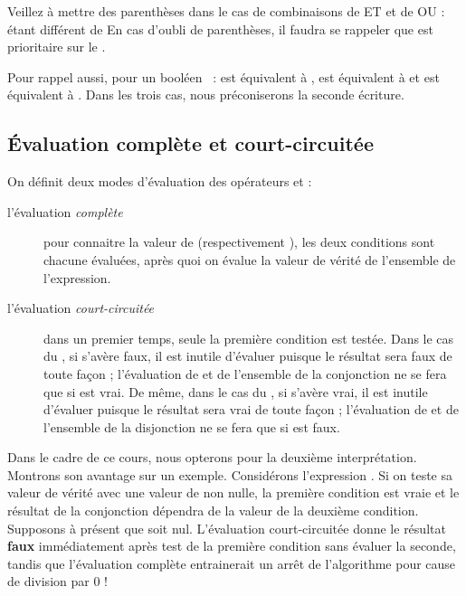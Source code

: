 			Veillez à mettre des parenthèses dans le cas de combinaisons de ET et de
			OU :  étant différent de
			 En cas
			d'oubli de parenthèses, il faudra se rappeler que
			 est prioritaire sur le .
			
			Pour rappel aussi, pour un booléen ~: 
			 est équivalent à ,
			 est équivalent à  et 
			 est équivalent à .
			Dans les trois cas, nous préconiserons la seconde écriture.
	
		\subsection{Évaluation complète et court-circuitée}
	
			On définit deux modes d’évaluation des opérateurs 
			et  :
	
			\begin{description}
			\item[l’évaluation \textit{complète}]
				pour connaitre la valeur de
				 (respectivement
				), les deux conditions sont chacune
				évaluées, après quoi on évalue la valeur de vérité de l’ensemble de
				l'expression.
			\item[l’évaluation \textit{court-circuitée}]
				dans un premier temps, seule la
				première condition est testée. Dans le cas du ,
				si  s’avère faux, il est inutile d’évaluer
				 puisque le résultat sera faux de toute façon
				; l’évaluation de  et de l’ensemble de la
				conjonction ne se fera que si  est vrai. De
				même, dans le cas du , si
				 s’avère vrai, il est inutile d’évaluer
				 puisque le résultat sera vrai de toute façon
				; l’évaluation de  et de l’ensemble de la
				disjonction ne se fera que si  est faux.
			\end{description}
	
			Dans le cadre de ce cours, nous opterons pour la deuxième 
			interprétation.
			Montrons son avantage sur un exemple.
			Considérons	l’expression 
			\textstyleCodeInsr{${\neq}$}. Si on teste sa valeur de vérité avec une
			valeur de  non nulle, la première condition est
			vraie et le résultat de la conjonction dépendra de la valeur de la
			deuxième condition. Supposons à présent que  soit
			nul. L’évaluation court-circuitée donne le résultat \textbf{faux}
			immédiatement après test de la première condition sans évaluer la
			seconde, tandis que l’évaluation complète entrainerait un arrêt de
			l’algorithme pour cause de division par 0 !
	
